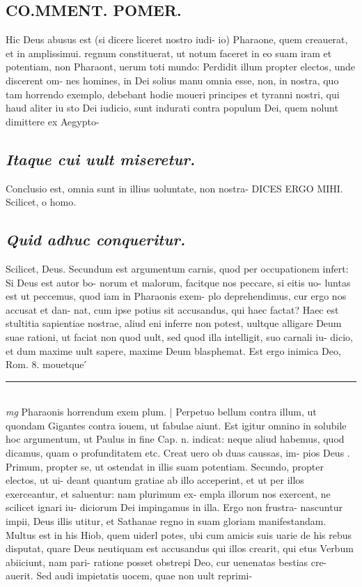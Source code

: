 \documentclass{article}
\begin{document}
\begin{pages}
\section*{CO.MMENT. POMER.  }\pstart Hic Deus abusus est (si dicere liceret nostro iudi- io) Pharaone, quem creauerat, et in amplissimui. regnum constituerat, ut notum faceret in eo suam iram et potentiam, non Pharaont, uerum toti mundo: Perdidit illum propter electos, unde discerent om- nes homines, in Dei solius manu omnia esse, non, in nostra, quo tam horrendo exemplo, debebant hodie moueri principes et tyranni nostri, qui haud aliter iu sto Dei iudicio, sunt indurati contra populum Dei, quem nolunt dimittere ex Aegypto-  \pend
{}
{}
\subsection*{\textit{Itaque cui uult miseretur. }}\pstart Conclusio est, omnia sunt in illius uoluntate, non nostra- DICES ERGO MIHI. Scilicet, o homo.  \pend
{}
{}
\subsection*{\textit{Quid adhuc conqueritur. }}\pstart Scilicet, Deus. Secundum est argumentum carnis, quod per occupationem infert: Si Deus est autor bo- norum et malorum, facitque nos peccare, si eitis uo- luntas est ut peccemus, quod iam in Pharaonis exem- plo deprehendimus, cur ergo nos accusat et dan- nat, cum ipse potius sit accusandus, qui haec factat? Haec est stultitia sapientiae nostrae, aliud eni inferre non potest, uultque alligare Deum suae rationi, ut faciat non quod uult, sed quod illa intelligit, suo carnali iu- dicio, et dum maxime uult sapere, maxime Deum blasphemat. Est ergo inimica Deo, Rom. 8. mouetque ́  \pend
\vspace{0.5cm}\noindent
\vspace{0.2cm}\rule{1cm}{0.2pt}\\ 
\hspace{0.2cm}\textit{mg}
\footnotesize Pharaonis horrendum exem plum.  
\normalsize| 
\marginpar{[ p.113 ]}\pstart Perpetuo bellum contra illum, ut quondam Gigantes contra iouem, ut fabulae aiunt. Est igitur omnino in solubile hoc argumentum, ut Paulus in fine Cap. n.  indicat: neque aliud habemus, quod dicamus, quam o profunditatem etc. Creat uero ob duas caussas, im- pios Deus . Primum, propter se, ut ostendat in illis suam potentiam. Secundo, propter electos, ut ui- deant quantum gratiae ab illo acceperint, et ut per illos exerceantur, et saluentur: nam plurimum ex- empla illorum nos exercent, ne scilicet ignari iu- diciorum Dei impingamus in illa. Ergo non frustra- nascuntur impii, Deus illis utitur, et Sathanae regno in suam gloriam manifestandam. Multus est in his Hiob, quem uiderl potes, ubi cum amicis suis uarie de his rebus disputat, quare Deus neutiquam est accusandus qui illos crearit, qui etus Verbum abiiciunt, nam pari- ratione posset obstrepi Deo, cur uenenatas bestias cre- auerit. Sed audi impietatis uocem, quae non uult reprimi-  \pend
{}
{}

\end{pages}
\end{document}
